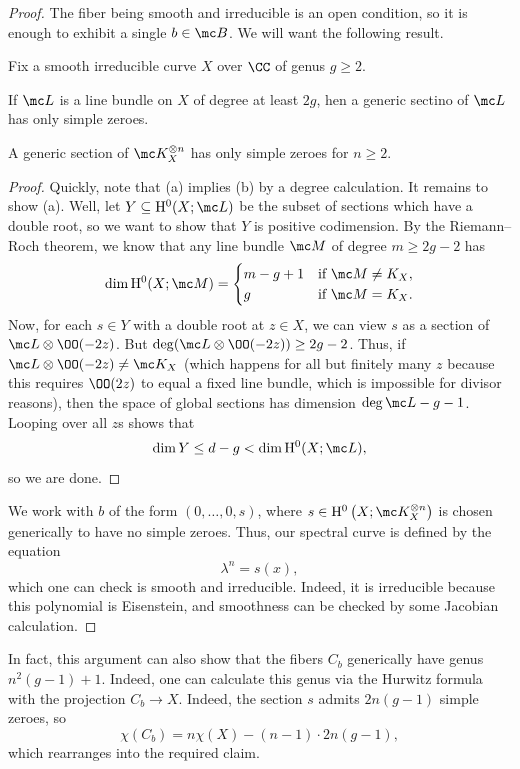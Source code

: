 \documentclass[../notes.tex]{subfiles}
\begin{document}
\begin{proof}
	The fiber being smooth and irreducible is an open condition, so it is enough to exhibit a single $b\in\mc B$. We will want the following result.
	\begin{lemma}
		Fix a smooth irreducible curve $X$ over $\CC$ of genus $g\ge2$.
		\begin{listalph}
			\item If $\mc L$ is a line bundle on $X$ of degree at least $2g$, hen a generic sectino of $\mc L$ has only simple zeroes.
			\item A generic section of $\mc K_X^{\otimes n}$ has only simple zeroes for $n\ge2$.
		\end{listalph}
	\end{lemma}
	\begin{proof}
		Quickly, note that (a) implies (b) by a degree calculation. It remains to show (a). Well, let $Y\subseteq\mathrm H^0(X;\mc L)$ be the subset of sections which have a double root, so we want to show that $Y$ is positive codimension. By the Riemann--Roch theorem, we know that any line bundle $\mc M$ of degree $m\ge2g-2$ has
		\[\dim\mathrm H^0(X;\mc M)=\begin{cases}
			m-g+1 & \text{if }\mc M\ne K_X, \\
			g & \text{if }\mc M=K_X.
		\end{cases}\]
		Now, for each $s\in Y$ with a double root at $z\in X$, we can view $s$ as a section of $\mc L\otimes\OO(-2z)$. But $\deg(\mc L\otimes\OO(-2z))\ge2g-2$. Thus, if $\mc L\otimes\OO(-2z)\ne\mc K_X$ (which happens for all but finitely many $z$ because this requires $\OO(2z)$ to equal a fixed line bundle, which is impossible for divisor reasons), then the space of global sections has dimension $\deg\mc L-g-1$. Looping over all $z$s shows that
		\[\dim Y\le d-g<\dim\mathrm H^0(X;\mc L),\]
		so we are done.
	\end{proof}
	We work with $b$ of the form $(0,\ldots,0,s)$, where $s\in\mathrm H^0\left(X;\mc K_X^{\otimes n}\right)$ is chosen generically to have no simple zeroes. Thus, our spectral curve is defined by the equation
	\[\lambda^n=s(x),\]
	which one can check is smooth and irreducible. Indeed, it is irreducible because this polynomial is Eisenstein, and smoothness can be checked by some Jacobian calculation.
\end{proof}
\begin{remark}
	In fact, this argument can also show that the fibers $C_b$ generically have genus $n^2(g-1)+1$. Indeed, one can calculate this genus via the Hurwitz formula with the projection $C_b\to X$. Indeed, the section $s$ admits $2n(g-1)$ simple zeroes, so
	\[\chi(C_b)=n\chi(X)-(n-1)\cdot 2n(g-1),\]
	which rearranges into the required claim.
\end{remark}
\end{document}
